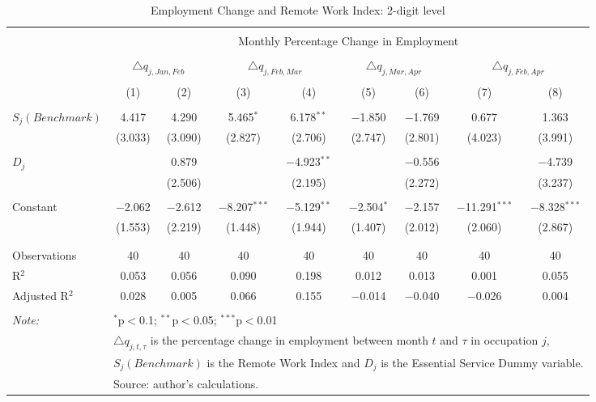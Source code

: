
\begin{table}[!htbp] \centering 
  \caption{Employment Change and Remote Work Index: 2-digit level} 
  \label{tab:regression_dynamics_2digit} 
\footnotesize 
\begin{tabular}{@{\extracolsep{5pt}}lcccccccc} 
\\[-1.8ex]\hline 
\hline \\[-1.8ex] 
 & \multicolumn{8}{c}{Monthly Percentage Change in Employment} \\ 
\cline{2-9} 
\\[-1.8ex] & \multicolumn{2}{c}{$\triangle q_{j,Jan,Feb}$} & \multicolumn{2}{c}{$\triangle q_{j,Feb,Mar}$} & \multicolumn{2}{c}{$\triangle q_{j,Mar,Apr}$} & \multicolumn{2}{c}{$\triangle q_{j,Feb,Apr}$} \\ 
\\[-1.8ex] & (1) & (2) & (3) & (4) & (5) & (6) & (7) & (8)\\ 
\hline \\[-1.8ex] 
 $S_{j} (Benchmark)$ & 4.417 & 4.290 & 5.465$^{*}$ & 6.178$^{**}$ & $-$1.850 & $-$1.769 & 0.677 & 1.363 \\ 
  & (3.033) & (3.090) & (2.827) & (2.706) & (2.747) & (2.801) & (4.023) & (3.991) \\ 
  & & & & & & & & \\ 
 $D_{j}$ &  & 0.879 &  & $-$4.923$^{**}$ &  & $-$0.556 &  & $-$4.739 \\ 
  &  & (2.506) &  & (2.195) &  & (2.272) &  & (3.237) \\ 
  & & & & & & & & \\ 
 Constant & $-$2.062 & $-$2.612 & $-$8.207$^{***}$ & $-$5.129$^{**}$ & $-$2.504$^{*}$ & $-$2.157 & $-$11.291$^{***}$ & $-$8.328$^{***}$ \\ 
  & (1.553) & (2.219) & (1.448) & (1.944) & (1.407) & (2.012) & (2.060) & (2.867) \\ 
  & & & & & & & & \\ 
\hline \\[-1.8ex] 
Observations & 40 & 40 & 40 & 40 & 40 & 40 & 40 & 40 \\ 
R$^{2}$ & 0.053 & 0.056 & 0.090 & 0.198 & 0.012 & 0.013 & 0.001 & 0.055 \\ 
Adjusted R$^{2}$ & 0.028 & 0.005 & 0.066 & 0.155 & $-$0.014 & $-$0.040 & $-$0.026 & 0.004 \\ 
\hline 
\hline \\[-1.8ex] 
\textit{Note:}  & \multicolumn{8}{l}{$^{*}$p$<$0.1; $^{**}$p$<$0.05; $^{***}$p$<$0.01} \\ 
 & \multicolumn{8}{l}{$\triangle q_{j,t,\tau}$ is the percentage change in employment between month $t$ and $\tau$ in occupation $j$,} \\ 
 & \multicolumn{8}{l}{$S_{j} (Benchmark)$ is the Remote Work Index and $D_{j}$ is the Essential Service Dummy variable.} \\ 
 & \multicolumn{8}{l}{Source: author's calculations.} \\ 
\end{tabular} 
\end{table} 
